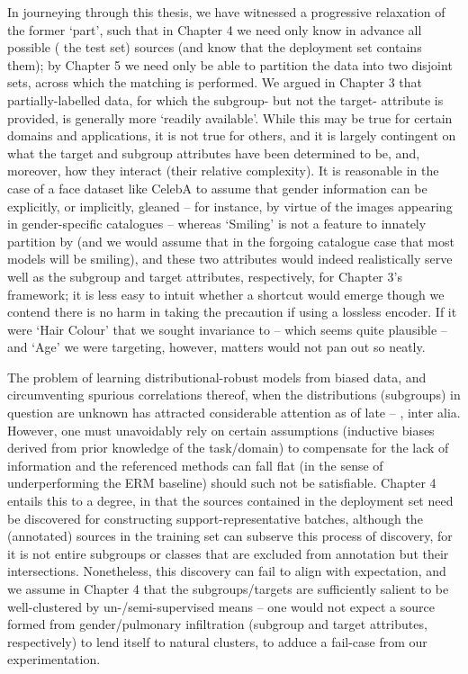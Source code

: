 %
In journeying through this thesis, we have witnessed a progressive relaxation of the former `part',
such that in Chapter 4 we need only know in advance all possible (\wrt{} the test set) sources (and
know that the deployment set contains them); by Chapter 5 we need only be able to partition the
data into two disjoint sets, across which the matching is performed.
%
We argued in Chapter 3 that partially-labelled data, for which the subgroup- but not the target-
attribute is provided, is generally more `readily available'. 
%
While this may be true for certain domains and applications, it is not true for others, and it is
largely contingent on what the target and subgroup attributes have been determined to be, and,
moreover, how they interact (their relative complexity).
%
It is reasonable in the case of a face dataset like CelebA to assume that gender information can be
explicitly, or implicitly, gleaned -- for instance, by virtue of the images appearing in
gender-specific catalogues -- whereas `Smiling' is not a feature to innately partition by (and we
would assume that in the forgoing catalogue case that most models will be smiling), and these two
attributes would indeed realistically serve well as the subgroup and target attributes,
respectively, for Chapter 3's framework; it is less easy to intuit whether a shortcut would emerge
though we contend there is no harm in taking the precaution if using a lossless encoder.
%
If it were `Hair Colour' that we sought invariance to -- which seems quite plausible -- and `Age'
we were targeting, however, matters would not pan out so neatly.

%
The problem of learning distributional-robust models from biased data, and circumventing spurious
correlations thereof, when the distributions (subgroups) in question are unknown has attracted
considerable attention as of late --  \cite{HasSriNamLia18, SohDunAngGuetal20,
creager2021environment, liu2021just, pezeshki2021gradient, taghanaki2022masktune, kim2022learning},
inter alia.
%
However, one must unavoidably rely on certain assumptions (inductive biases derived from prior
knowledge of the task/domain) to compensate for the lack of information and the referenced methods
can fall flat (in the sense of underperforming the ERM baseline) should such not be satisfiable.
%
Chapter 4 entails this to a degree, in that the sources contained in the deployment set need be
discovered for constructing support-representative batches, although the (annotated) sources in the
training set can subserve this process of discovery, for it is not entire subgroups or classes that
are excluded from annotation but their intersections.
%
Nonetheless, this discovery can fail to align with expectation, and we assume in Chapter 4 that the
subgroups/targets are sufficiently salient to be well-clustered by un-/semi-supervised means -- one
would not expect a source formed from gender/pulmonary infiltration (subgroup and target
attributes, respectively) to lend itself to natural clusters, to adduce a fail-case from our
experimentation. 


